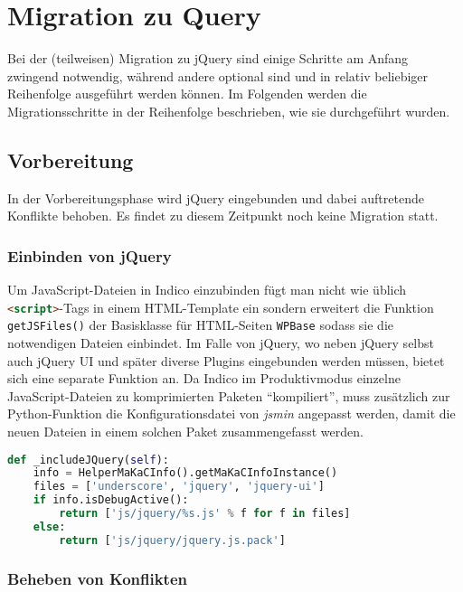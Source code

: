 \chapter{Migration zu Query}

Bei der (teilweisen) Migration zu jQuery sind einige Schritte am Anfang zwingend notwendig, während
andere optional sind und in relativ beliebiger Reihenfolge ausgeführt werden können. Im Folgenden
werden die Migrationsschritte in der Reihenfolge beschrieben, wie sie durchgeführt wurden.

\section{Vorbereitung}

In der Vorbereitungsphase wird jQuery eingebunden und dabei auftretende Konflikte behoben. Es findet
zu diesem Zeitpunkt noch keine Migration statt.

\subsection{Einbinden von jQuery}

Um JavaScript-Dateien in Indico einzubinden fügt man nicht wie üblich
\lstinline[language=HTML]{<script>}-Tags in einem HTML-Template ein sondern erweitert die Funktion
\lstinline{getJSFiles()} der Basisklasse für HTML-Seiten \lstinline{WPBase} sodass sie die
notwendigen Dateien einbindet. Im Falle von jQuery, wo neben jQuery selbst auch jQuery UI und später
diverse Plugins eingebunden werden müssen, bietet sich eine separate Funktion an. Da Indico im
Produktivmodus einzelne JavaScript-Dateien zu komprimierten Paketen \enquote{kompiliert}, muss
zusätzlich zur Python-Funktion die Konfigurationsdatei von \emph{jsmin} angepasst werden, damit die
neuen Dateien in einem solchen Paket zusammengefasst werden.

\begin{lstlisting}[language=Python,caption=Einbinden von jQuery und Underscore.js in Indico]
def _includeJQuery(self):
    info = HelperMaKaCInfo().getMaKaCInfoInstance()
    files = ['underscore', 'jquery', 'jquery-ui']
    if info.isDebugActive():
        return ['js/jquery/%s.js' % f for f in files]
    else:
        return ['js/jquery/jquery.js.pack']
\end{lstlisting}

\subsection{Beheben von Konflikten}

